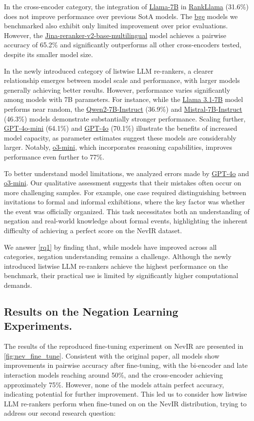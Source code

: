 In the cross-encoder category, the integration of \url{Llama-7B} in \url{RankLlama} (31.6\%) does not improve performance over previous SotA models. The \url{bge} models we benchmarked also exhibit only limited improvement over prior evaluations. However, the \url{Jina-reranker-v2-base-multilingual} model achieves a pairwise accuracy of 65.2\% and significantly outperforms all other cross-encoders tested, despite its smaller model size.

In the newly introduced category of listwise LLM re-rankers, a clearer relationship emerges between model scale and performance, with larger models generally achieving better results. However, performance varies significantly among models with 7B parameters. For instance, while the \url{Llama 3.1-7B} model performs near random, the \url{Qwen2-7B-Instruct} (36.9\%) and \url{Mistral-7B-Instruct} (46.3\%) models demonstrate substantially stronger performance. Scaling further, \url{GPT-4o-mini} (64.1\%) and \url{GPT-4o} (70.1\%) illustrate the benefits of increased model capacity, as parameter estimates suggest these models are considerably larger. Notably, \url{o3-mini}, which incorporates reasoning capabilities, improves performance even further to 77\%.

To better understand model limitations, we analyzed errors made by \url{GPT-4o} and \url{o3-mini}. Our qualitative assessment suggests that their mistakes often occur on more challenging samples. For example, one case required distinguishing between invitations to formal and informal exhibitions, where the key factor was whether the event was officially organized. This task necessitates both an understanding of negation and real-world knowledge about formal events, highlighting the inherent difficulty of achieving a perfect score on the NevIR dataset.

We answer \ref{rq1} by finding that, while models have improved across all categories, negation understanding remains a challenge. Although the newly introduced listwise LLM re-rankers achieve the highest performance on the benchmark, their practical use is limited by significantly higher computational demands.

    
\subsection{Results on the Negation Learning Experiments.}

The results of the reproduced fine-tuning experiment on NevIR are presented in \autoref{fig:nev_fine_tune}. Consistent with the original paper, all models show improvements in pairwise accuracy after fine-tuning, with the bi-encoder and late interaction models reaching around 50\%, and the cross-encoder achieving approximately 75\%. However, none of the models attain perfect accuracy, indicating potential for further improvement. This led us to consider how listwise LLM re-rankers perform when fine-tuned on on the NevIR distribution, trying to address our second research question:

